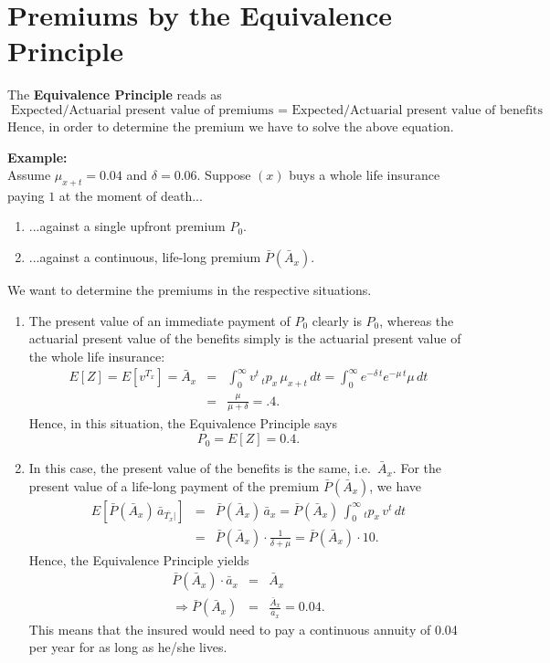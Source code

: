 \documentclass[11pt,fleqn,oneside]{book}
\begin{document}
\section{Premiums by the Equivalence Principle}
\label{SECEQPRINC}
The \textbf{Equivalence Principle} reads as
$$
\text{Expected/Actuarial present value of premiums } = \text{ Expected/Actuarial present value of benefits}  
$$
Hence, in order to determine the premium we have to solve the above equation.

\noindent \textbf{Example:}\\
Assume $\mu_{x+t} = 0.04$ and $\delta = 0.06$. Suppose $(x)$ buys a whole life insurance paying $1$ at the moment of death...
\begin{enumerate}
\item ...against a single upfront premium $P_0$.
\item ...against a continuous, life-long premium ${\bar{P}\left(\bar{A}_x\right)}$.
\end{enumerate}
We want to determine the premiums in the respective situations.
\begin{enumerate}
\item The present value of an immediate payment of $P_0$ clearly is $P_0$, whereas the actuarial present value of the benefits simply is the actuarial present value of the whole life insurance:
\begin{eqnarray*}
  E[Z] = E[v^{T_x}] = \bar{A}_x &=& \int_0^\infty v^t\,{_tp_x}\,\mu_{x+t}\,dt = \int_0^{\infty} e^{-\delta \,t}e^{-\mu \,t}\mu\,dt\\
  &=& \frac{\mu}{\mu + \delta} = .4.
\end{eqnarray*}
Hence, in this situation, the Equivalence Principle says
$$
P_0 = E[Z] = 0.4.
$$
\item In this case, the present value of the benefits is the same, i.e.\ $\bar{A}_x$. For the present value of a life-long payment of the premium ${\bar{P}\left(\bar{A}_x\right)}$, we have
\begin{eqnarray*}
E\left[{\bar{P}\left(\bar{A}_x\right)}\,\bar{a}_{\overline{T_x}|}\right] &=& {\bar{P}\left(\bar{A}_x\right)} \, \bar{a}_x = {\bar{P}\left(\bar{A}_x\right)} \, \int_0^{\infty} {_tp_x}\,v^t\,dt\\
&=& {\bar{P}\left(\bar{A}_x\right)}\cdot \frac{1}{\delta + \mu} =  {\bar{P}\left(\bar{A}_x\right)} \cdot 10.
\end{eqnarray*} 
Hence, the Equivalence Principle yields
\begin{eqnarray*}
{\bar{P}\left(\bar{A}_x\right)} \cdot \bar{a}_x &=& \bar{A}_x \\
\Rightarrow {\bar{P}\left(\bar{A}_x\right)} &=& \frac{\bar{A}_x}{\bar{a}_x} = 0.04.
\end{eqnarray*}
This means that the insured would need to pay a continuous annuity of 0.04 per year for as long as he/she lives.
\end{enumerate}
\end{document}

